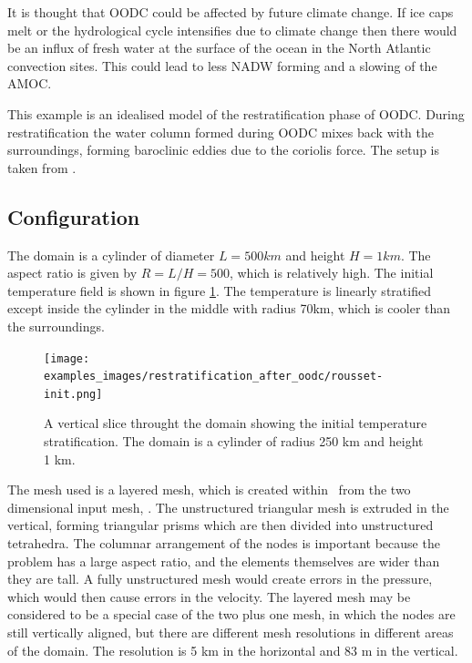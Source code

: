It is thought that OODC could be affected by future climate change. If ice caps melt or the hydrological cycle intensifies due to climate change then there would be an influx of fresh water at the surface of the ocean in the North Atlantic convection sites. This could lead to less NADW forming and a slowing of the AMOC.  

This example is an idealised model of the restratification phase of OODC. During restratification the water column formed during OODC mixes back with the surroundings, forming baroclinic eddies due to the coriolis force. The setup is taken from  \cite{rousset09}. 

\subsection{Configuration}

The domain is a cylinder of diameter $L=500\unit{km}$ and height $H=1\unit{km}$. The aspect ratio is given by $R=L/H=500$, which is relatively high.  The initial temperature field is shown in figure \ref{fig:rousset-init}. The temperature is linearly stratified except inside the cylinder in the middle with radius 70km, which is cooler than the surroundings. 

\begin{figure}[h]
\begin{center}
\texttt{[image: examples\_images/restratification\_after\_oodc/rousset-init.png]}
\caption{A vertical slice throught the domain showing the initial temperature stratification. The domain is a cylinder of radius 250 km and height 1 km. }
\label{fig:rousset-init}
\end{center}
\end{figure}


The mesh used is a layered mesh, which is created within \fluidity\ from the two dimensional input mesh, . The unstructured triangular mesh is extruded in the vertical, forming triangular prisms which are then divided into unstructured tetrahedra. The columnar arrangement of the nodes is important because the problem has a large aspect ratio, and the elements themselves are wider than they are tall. A fully unstructured mesh would create errors in the pressure, which would then cause errors in the velocity. The layered mesh may be considered to be a special case of the two plus one mesh, in which the nodes are still vertically aligned, but there are different mesh resolutions in different areas of the domain. The resolution is 5 km in the horizontal and 83 m in the vertical. 


